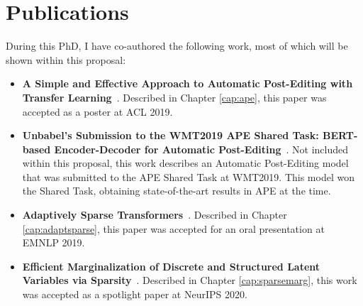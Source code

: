 \section{Publications}
\label{sec:int_publications}

During this PhD, I have co-authored the following work,
most of which will be shown within this proposal:

\begin{itemize}

    \item {\bf A Simple and Effective Approach to Automatic
    Post-Editing with Transfer Learning}~\citep{Correia2019}.
    Described in Chapter \ref{cap:ape}, this paper was accepted as a
    poster at ACL 2019.

    \item {\bf Unbabel's Submission to the WMT2019 APE Shared Task:
    BERT-based Encoder-Decoder for Automatic
    Post-Editing}~\citep{lopes2019unbabels}. Not included within this
    proposal, this work describes an Automatic Post-Editing model
    that was submitted to the APE Shared Task at WMT2019. This model
    won the Shared Task, obtaining state-of-the-art results in APE at
    the time.

    \item {\bf Adaptively Sparse
    Transformers}~\citep{correia2019adaptively}. Described in Chapter
    \ref{cap:adaptsparse}, this paper was accepted for an oral
    presentation at EMNLP 2019.

    \item {\bf Efficient Marginalization of Discrete and Structured
    Latent Variables via Sparsity}~\citep{correia2020procneurips}.
    Described in Chapter \ref{cap:sparsemarg}, this work was
    accepted as a spotlight paper at NeurIPS 2020.
    
\end{itemize}